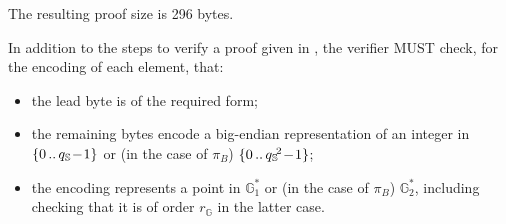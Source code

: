 \documentclass{article}
\newcommand{\textbnx}[1]{{\fontseries{b}\selectfont #1}}
\newcommand{\introlist}{\needspace{15ex}}
\numberwithin{theorem}{subsection}
\newcommand{\conformance}[1]{\textbnx{#1}\xspace}
\newcommand{\MUST}{\conformance{MUST}}
\newcommand{\setof}[1]{\{{#1}\}}
\newcommand{\barerange}[2]{{#1}\,..\,{#2}}
\newcommand{\range}[2]{\setof{\barerange{#1}{#2}}}
\newcommand{\Proof}[1]{\pi_{\!{#1}}}
\newcommand{\ParamG}[1]{{{#1}_\mathbb{G}}}
\newcommand{\GroupGstar}[1]{\mathbb{G}^\ast_{#1}}
\newcommand{\ParamS}[1]{{{#1}_\mathbb{\hskip 0.03em S}}}
\newcommand{\ParamSexp}[2]{{{#1}_\mathbb{\hskip 0.03em S}\!}^{#2}}
\begin{document}
The resulting proof size is 296 bytes.

\vspace{0.8ex}
\introlist
In addition to the steps to verify a proof given in \cite[Appendix B]{BCTV2015}, the
verifier \MUST check, for the encoding of each element, that:

\begin{itemize}
  \item the lead byte is of the required form;
  \item the remaining bytes encode a big-endian representation of an integer in
        $\range{0}{\ParamS{q}\!-\!1}$ or (in the case of $\Proof{B}$)
        $\range{0}{\ParamSexp{q}{2}\!-\!1}$;
  \item the encoding represents a point in $\GroupGstar{1}$ or (in the case of
        $\Proof{B}$) $\GroupGstar{2}$, including checking that it is of order
        $\ParamG{r}$ in the latter case.
\end{itemize}
\end{document}
